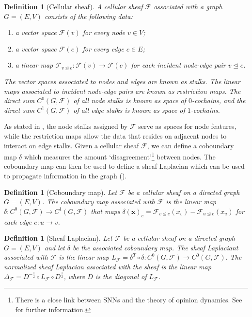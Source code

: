 \documentclass[11pt,a4paper,openright,twoside]{report}
\newcounter{mycounter}
\theoremstyle{plain}
\newtheorem{definition}[mycounter]{Definition}
\theoremstyle{definition}
\begin{document}
\begin{definition}[Cellular sheaf]
  A cellular sheaf $\mathcal{F}$ associated with a graph $G = (E,V)$ consists of the following data:
  \begin{enumerate}
    \item a vector space $\mathcal{F}(v)$ for every node $v \in V$;
    \item a vector space $\mathcal{F}(e)$ for every edge $e \in E$;
    \item a linear map $\mathcal{F}_{v \trianglelefteq e}: \mathcal{F}(v) \to \mathcal{F}(e)$ for each incident node-edge pair $v \trianglelefteq e$.
  \end{enumerate}
  The vector spaces associated to nodes and edges are known as stalks. The linear maps associated to incident node-edge pairs are known as restriction maps. The direct sum $C^0(G, \mathcal{F})$ of all node stalks is known as space of $0$-cochains, and the direct sum $C^1(G, \mathcal{F})$ of all edge stalks is known as space of $1$-cochains.
\end{definition}

As stated in \cite{zaghen2024nonlinear}, the  node stalks assigned by $\mathcal{F}$ serve as spaces for node features, while the restriction maps allow the data that resides on adjacent nodes to interact on edge stalks. Given a cellular sheaf $\mathcal{F}$, we can define a coboundary map $\delta$ which measures the amount \lq disagreement\rq\footnote{There is a close link between SNNs and the theory of opinion dynamics. See \cite{zaghen2024nonlinear} for further information.} between nodes. The coboundary map can then be used to define a sheaf Laplacian which can be used to propagate information in the graph (\cite{hansen2020sheaf}).

\begin{definition}[Coboundary map]
  Let $\mathcal{F}$ be a cellular sheaf on a directed graph $G = (E,V)$. The coboundary map associated with $\mathcal{F}$ is the linear map $\delta: C^0(G, \mathcal{F}) \to C^1(G, \mathcal{F})$ that maps $\delta(\mathbf{x})_{e} = \mathcal{F}_{v \trianglelefteq e}(x_v) - \mathcal{F}_{u \trianglelefteq e}(x_u)$ for each edge $e: u \to v$.
\end{definition}

\begin{definition}[Sheaf Laplacian]
  Let $\mathcal{F}$ be a cellular sheaf on a directed graph $G = (E,V)$ and let $\delta$ be the associated coboundary map. The sheaf Laplaciant associated with $\mathcal{F}$ is the linear map $L_{\mathcal{F}} = \delta^T \circ \delta: C^0(G, \mathcal{F}) \to C^0(G, \mathcal{F})$. The normalized sheaf Laplacian associated with the sheaf is the linear map $\Delta_{\mathcal{F}} = D^{-\frac{1}{2}} \circ L_{\mathcal{F}} \circ D^{\frac{1}{2}}$, where $D$ is the diagonal of $L_{\mathcal{F}}$.
\end{definition}
\end{document}
